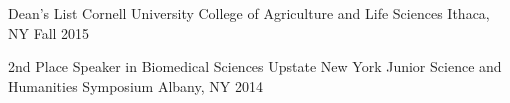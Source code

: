 



\begin{cvhonors}

\cvhonor
    {Dean's List} %
    {Cornell University College of Agriculture and Life Sciences} %
    {Ithaca, NY} %
    {Fall 2015} %

\cvhonor
    {2nd Place Speaker in Biomedical Sciences} %
    {Upstate New York Junior Science and Humanities Symposium} %
    {Albany, NY} %
    {2014} %


\end{cvhonors}







